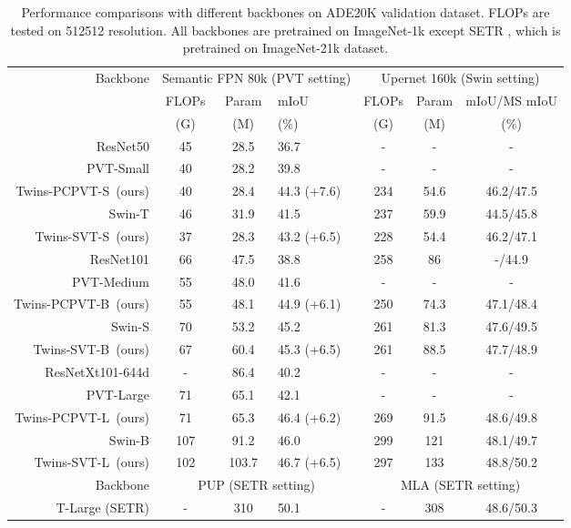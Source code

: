 \documentclass{article}
\newcommand{\blue}{\color{blue}}
\def \altsmall   {Twins-SVT-S}
\def \altbase   {Twins-SVT-B}
\def \altlarge   {Twins-SVT-L}
\def \pcpvtsmall {Twins-PCPVT-S}
\def \pcpvtbase {Twins-PCPVT-B}
\def \pcpvtlarge {Twins-PCPVT-L}
\begin{document}
\begin{table}
\vskip -0.25in
 \setlength\tabcolsep{5pt}
	\caption{Performance comparisons with different backbones on ADE20K validation dataset. FLOPs are tested on 512512 resolution. All backbones are pretrained on ImageNet-1k except SETR \cite{SETR}, which is pretrained on ImageNet-21k dataset.}
	\label{tab: segmentation}
	\centering
	\small 
\begin{tabular}{r*{2}{c}l|*{3}{c}}
		\toprule
	    \multirow{2}{*}{Backbone}     & \multicolumn{3}{c|}{Semantic FPN 80k (PVT \cite{wang2021pyramid} setting)}   & \multicolumn{3}{c}{Upernet 160k (Swin \cite{liu2021swin} setting)}  \\
	    & FLOPs &Param & mIoU  & FLOPs & Param & mIoU/MS mIoU \\
	    & (G) & (M) & (\%) & (G) & (M) & (\%) \\
		\midrule
		ResNet50 \cite{he2016deep} &45 & 28.5 & 36.7 &-&-&-  \\
		PVT-Small \cite{wang2021pyramid}  &40& 28.2& 39.8  &-&-&-    \\
		\pcpvtsmall\  (ours) &40&28.4 & 44.3 \blue(+7.6)& 234&54.6& 46.2/47.5\\
		Swin-T \cite{liu2021swin} &46&31.9 &41.5&237& 59.9&44.5/45.8\\

\altsmall\  (ours) & 37 & 28.3 & 43.2 \blue(+6.5)& 228 & 54.4& 46.2/47.1\\
		\midrule
		ResNet101 \cite{he2016deep} &66& 47.5 & 38.8& 258 &86& -/44.9\\
		PVT-Medium \cite{wang2021pyramid} &55&48.0 &41.6&-&-&- \\
		\pcpvtbase\ (ours)  & 55 &48.1&44.9 \blue(+6.1)& 250& 74.3& 47.1/48.4\\
		Swin-S \cite{liu2021swin} &70& 53.2& 45.2 &261 &81.3&47.6/49.5\\



		\altbase\ (ours) & 67& 60.4&45.3 \blue(+6.5)& 261 & 88.5 & 47.7/48.9\\
		\midrule
		ResNetXt101-644d \cite{xie2017aggregated}& - &86.4& 40.2&-&-&-  \\
		PVT-Large \cite{wang2021pyramid}& 71 &65.1 & 42.1&-&-&- \\
\pcpvtlarge\ (ours) & 71 &65.3& 46.4  \blue(+6.2)&269 &91.5&48.6/49.8 \\
		Swin-B \cite{liu2021swin} &107&91.2&46.0&299& 121& 48.1/49.7 \\
		\altlarge\  (ours) & 102 & 103.7& 46.7 \blue(+6.5)& 297 &133&48.8/50.2\\
		\midrule
		  Backbone   & \multicolumn{3}{c|}{PUP (SETR \cite{SETR} setting)}   & \multicolumn{3}{c}{MLA (SETR \cite{SETR} setting)} \\
		 \midrule
T-Large (SETR) \cite{SETR}& - & 310 & 50.1 & - & 308 & 48.6/50.3\\
		
		\bottomrule
	\end{tabular}
\end{table}
\end{document}
